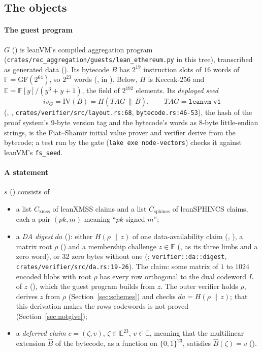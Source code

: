 \documentclass[11pt]{article}
\newcommand{\Cx}{C_{\mathrm{xmss}}}
\newcommand{\Cs}{C_{\mathrm{sphincs}}}
\begin{document}
\subsection{The objects}

\paragraph{The guest program} $G$ () is leanVM's compiled aggregation
program (\texttt{crates/rec\_aggregation/guests/lean\_ethereum.py} in this tree),
transcribed as generated data (). Its bytecode $B$ has $2^{19}$ instruction
slots of $16$ words of $\mathbb{F} = \mathrm{GF}(2^{64})$, so $2^{23}$ words
(, in ). Below, $H$ is Keccak-256 and
$\mathbb{E} = \mathbb{F}[y]/(y^3+y+1)$, the field of $2^{192}$ elements. Its \emph{deployed seed}
\[
iv_G = \mathrm{IV}(B) = H(\mathit{TAG} \,\|\, \bar B), \qquad \mathit{TAG} = \texttt{leanvm-v1}
\]
(, , \texttt{crates/verifier/src/layout.rs:68},
\texttt{bytecode.rs:46-53}), the hash of the proof system's $9$-byte version tag and the bytecode's
words as $8$-byte little-endian strings, is the Fiat--Shamir initial value prover and verifier
derive from the bytecode; a test run by the gate (\texttt{lake exe node-vectors}) checks it against
leanVM's \texttt{fs\_seed}.

\paragraph{A statement} $s$ () consists of
\begin{itemize}
\item a list $\Cx$ of leanXMSS claims and a list $\Cs$ of leanSPHINCS claims, each a pair $(pk, m)$
meaning ``$pk$ signed $m$'';
\item a \emph{DA digest} $\mathit{da}$ (): either $H(\rho \,\|\, z)$ of one
data-availability claim (, ), a matrix root $\rho$
() and a membership challenge $z \in \mathbb{E}$ (, as its
three limbs and a zero word), or $32$ zero bytes without one (;
\texttt{verifier::da::digest}, \texttt{crates/verifier/src/da.rs:19-26}). The claim: some matrix of
$1$ to $1024$ encoded blobs with root $\rho$ has every row orthogonal to the dual codeword $L$ of $z$
(), which the guest program builds from $z$. The outer verifier holds
$\rho$, derives $z$ from $\rho$ (Section~\ref{sec:schemes}) and checks $\mathit{da} = H(\rho \,\|\, z)$; that
this derivation makes the rows codewords is not proved (Section~\ref{sec:notgive});
\item a \emph{deferred claim} $c = (\zeta, v)$, $\zeta \in \mathbb{E}^{23}$, $v \in \mathbb{E}$, meaning
that the multilinear extension $\widehat{B}$ of the bytecode, as a function on $\{0,1\}^{23}$,
satisfies $\widehat{B}(\zeta) = v$ ().
\end{itemize}
\end{document}
